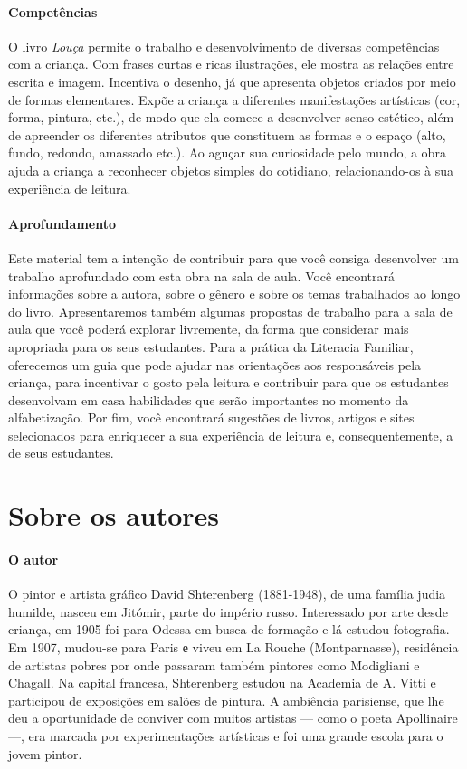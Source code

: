 \documentclass[11pt]{extarticle}
\begin{document}
\paragraph{Competências} O livro \textit{Louça} permite o trabalho e desenvolvimento de diversas competências com a criança. Com frases curtas e ricas ilustrações, ele mostra as relações entre escrita e imagem. Incentiva o desenho, já que apresenta objetos criados por meio de formas elementares. Expõe a criança a diferentes manifestações artísticas (cor, forma, pintura, etc.), de modo que ela comece a desenvolver senso estético, além de apreender os diferentes atributos que constituem as formas e o espaço (alto, fundo, redondo, amassado etc.). Ao aguçar sua curiosidade pelo mundo, a obra ajuda a criança a reconhecer objetos simples do cotidiano, relacionando-os à sua experiência de leitura.

\paragraph{Aprofundamento} Este material tem a 
intenção de contribuir para que você consiga desenvolver um trabalho aprofundado 
com esta obra na sala de aula. Você encontrará informações sobre a autora, sobre 
o gênero e sobre os temas trabalhados ao longo do livro. Apresentaremos também 
algumas propostas de trabalho para a sala de aula que você poderá explorar livremente, 
da forma que considerar mais apropriada para os seus estudantes. Para a prática 
da Literacia Familiar, oferecemos um guia que pode ajudar nas orientações aos 
responsáveis pela criança, para incentivar o gosto pela leitura e contribuir para 
que os estudantes desenvolvam em casa habilidades que serão importantes no momento 
da alfabetização. Por fim, você encontrará sugestões de livros, artigos e sites 
selecionados para enriquecer a sua experiência de leitura e, 
consequentemente, a de seus estudantes.



\section{Sobre os autores}


\paragraph{O autor} O pintor e artista gráfico David Shterenberg (1881-1948), de uma família judia humilde, nasceu em Jitómir, parte do império russo. Interessado por arte desde criança, em 1905 foi para Odessa em busca de formação e lá estudou fotografia. Em 1907, mudou-se para Paris е viveu em La Rouche (Montparnasse), residência de artistas pobres por onde passaram também pintores como Modigliani e Chagall. Na capital francesa, Shterenberg estudou na Academia de A. Vitti e participou de exposições em salões de pintura. A ambiência parisiense, que lhe deu a oportunidade de conviver com muitos artistas --- como o poeta Apollinaire ---, era marcada por experimentações artísticas e foi uma grande escola para o jovem pintor. 
\end{document}
